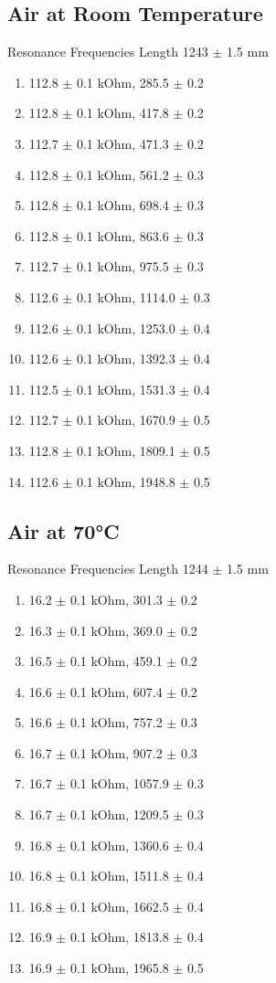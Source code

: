 \documentclass[]{scrartcl}
\begin{document}
\subsection{Air at Room Temperature}
Resonance Frequencies
Length 1243 $\pm$ 1.5 mm
\begin{enumerate}
	\item 112.8 $\pm$ 0.1 kOhm, 285.5 $\pm$ 0.2
	\item 112.8 $\pm$ 0.1 kOhm, 417.8 $\pm$ 0.2
	\item 112.7 $\pm$ 0.1 kOhm, 471.3 $\pm$ 0.2
	\item 112.8 $\pm$ 0.1 kOhm, 561.2 $\pm$ 0.3
	\item 112.8 $\pm$ 0.1 kOhm, 698.4 $\pm$ 0.3
	\item 112.8 $\pm$ 0.1 kOhm, 863.6 $\pm$ 0.3
	\item 112.7 $\pm$ 0.1 kOhm, 975.5 $\pm$ 0.3
	\item 112.6 $\pm$ 0.1 kOhm, 1114.0 $\pm$ 0.3
	\item 112.6 $\pm$ 0.1 kOhm, 1253.0 $\pm$ 0.4
	\item 112.6 $\pm$ 0.1 kOhm, 1392.3 $\pm$ 0.4
	\item 112.5 $\pm$ 0.1 kOhm, 1531.3 $\pm$ 0.4
	\item 112.7 $\pm$ 0.1 kOhm, 1670.9 $\pm$ 0.5
	\item 112.8 $\pm$ 0.1 kOhm, 1809.1 $\pm$ 0.5
	\item 112.6 $\pm$ 0.1 kOhm, 1948.8 $\pm$ 0.5
\end{enumerate}

\subsection{Air at 70°C}
Resonance Frequencies
Length 1244 $\pm$ 1.5 mm

\begin{enumerate}
	\item 16.2 $\pm$ 0.1 kOhm, 301.3 $\pm$ 0.2
	\item 16.3 $\pm$ 0.1 kOhm, 369.0 $\pm$ 0.2
	\item 16.5 $\pm$ 0.1 kOhm, 459.1 $\pm$ 0.2
	\item 16.6 $\pm$ 0.1 kOhm, 607.4 $\pm$ 0.2
	\item 16.6 $\pm$ 0.1 kOhm, 757.2 $\pm$ 0.3
	\item 16.7 $\pm$ 0.1 kOhm, 907.2 $\pm$ 0.3
	\item 16.7 $\pm$ 0.1 kOhm, 1057.9 $\pm$ 0.3
	\item 16.7 $\pm$ 0.1 kOhm, 1209.5 $\pm$ 0.3
	\item 16.8 $\pm$ 0.1 kOhm, 1360.6 $\pm$ 0.4
	\item 16.8 $\pm$ 0.1 kOhm, 1511.8 $\pm$ 0.4
	\item 16.8 $\pm$ 0.1 kOhm, 1662.5 $\pm$ 0.4
	\item 16.9 $\pm$ 0.1 kOhm, 1813.8 $\pm$ 0.4
	\item 16.9 $\pm$ 0.1 kOhm, 1965.8 $\pm$ 0.5
\end{enumerate}
\end{document}
